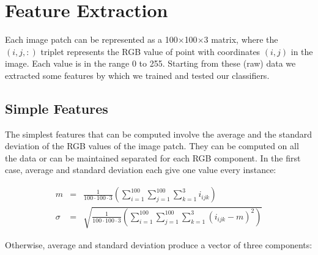 \vspace{0.5cm}




\section{Feature Extraction}
\label{ch4:FE}

Each image patch can be represented as a 100$\times$100$\times$3 matrix, where the $(i,j,:)$ triplet represents the RGB value of point with coordinates $(i,j)$ in the image.
Each value is in the range 0 to 255. Starting from these (raw) data we extracted some features by which we trained and tested our classifiers.

\vspace{0.5cm}

\subsection{Simple Features}
\label{ch4:sf}

The simplest features that can be computed involve the average and the standard deviation of the \Gls{RGB} values of the image patch. They can be computed on all the data or can be maintained separated
for each \Gls{RGB} component. In the first case, average and standard deviation each give one value every instance:

\begin{eqnarray}
 m & = & \frac{1}{100\cdot100\cdot3} \left( \sum_{i=1}^{100} \sum_{j=1}^{100} \sum_{k=1}^{3} i_{ijk} \right) \\
 \sigma & = & \sqrt{\frac{1}{100\cdot100\cdot3} \left( \sum_{i=1}^{100} \sum_{j=1}^{100} \sum_{k=1}^{3} (i_{ijk} - m )^2 \right)}
\end{eqnarray}

Otherwise, average and standard deviation produce a vector of three components:

